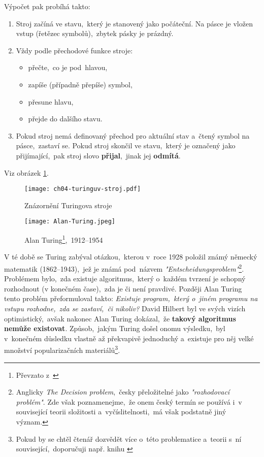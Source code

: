 Výpočet pak probíhá takto:
\begin{enumerate}
    \item Stroj začíná ve stavu,~který je stanovený jako počáteční. Na pásce je vložen vstup (řetězec symbolů),~zbytek pásky je prázdný.
    \item Vždy podle přechodové funkce stroje:
    \begin{itemize}
        \item přečte,~co je pod~hlavou,
        \item zapíše (případně přepíše) symbol,
        \item přesune hlavu,
        \item přejde do dalšího stavu.
    \end{itemize}
    \item Pokud stroj nemá definovaný přechod pro aktuální stav a~čtený symbol na pásce,~zastaví se. Pokud stroj skončil ve stavu,~který je označený jako přijímající,~pak stroj slovo \textbf{přijal},~jinak jej \textbf{odmítá}.
\end{enumerate}
Viz obrázek \ref{fig:turinguv-stroj}.
\begin{figure}[h]
    \centering
    \texttt{[image: ch04-turinguv-stroj.pdf]}
    \caption{Znázornění Turingova stroje}
    \label{fig:turinguv-stroj}
\end{figure}
\begin{figure}[h]
    \centering
    \texttt{[image: Alan-Turing.jpeg]}
    \caption[Alan Turing,~1871--1956]{Alan Turing\footnote{Převzato z~\cite{OConnorTuring2025}},~1912--1954}
    \label{fig:alan-turing}
\end{figure}
V té době se Turing zabýval otázkou,~kterou v~roce 1928 položil známý německý matematik  (1862--1943),~jež je známá pod~názvem \emph{"Entscheidungsproblem"}\footnote{Anglicky \emph{The Decision problem},~česky přeložitelné jako \emph{"rozhodovací problém"}. Zde však poznamenejme,~že onem český termín se používá i~v související teorii složitosti a~vyčíslitelnosti,~má však podstatně jiný význam.}. Problémem bylo,~zda existuje algoritmus,~který o~každém tvrzení je schopný rozhodnout (v konečném čase),~zda je či není pravdivé. Později Alan Turing tento problém přeformuloval takto: \emph{Existuje program,~který o~jiném programu na vstupu rozhodne,~zda se zastaví,~či nikoliv?} David Hilbert byl ve svých vizích optimistický,~avšak nakonec Alan Turing dokázal,~že \textbf{takový algoritmus nemůže existovat}. Způsob,~jakým Turing došel onomu výsledku,~byl v~konečném důsledku vlastně až překvapivě jednoduchý a~existuje pro něj velké množství popularizačních materiálů\footnote{Pokud by se chtěl čtenář dozvědět více o~této problematice a~teorii s~ní související,~doporučuji např. knihu \cite{Motwani2003}}.
